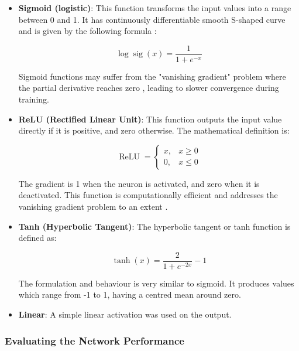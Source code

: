 \begin{itemize}
	\item \textbf{Sigmoid (logistic)}: This function transforms the input values into a range between 0 and 1. It has continuously differentiable smooth S-shaped curve and is given by the following formula \cite{Han1995}:
	
	\begin{equation}\label{Logistic sigmoid}
		\log \operatorname{sig}(x)=\frac{1}{1+e^{-x}}
	\end{equation} 
	
	Sigmoid functions may suffer from the "vanishing gradient" problem where the partial derivative reaches zero \cite{Sharma2020}, leading to slower convergence during training.
	
	\item \textbf{ReLU (Rectified Linear Unit)}: This function outputs the input value directly if it is positive, and zero otherwise. The mathematical definition is:
	
	\begin{equation}\label{ReLU}
		\operatorname{ReLU}= \begin{cases}x, & x \geq 0 \\ 0, & x \leq 0\end{cases}
	\end{equation}
	
	The gradient is 1 when the neuron is activated, and zero when it is deactivated. This function is computationally efficient and addresses the vanishing gradient problem to an extent \cite{Sharma2020}.
	
	\item \textbf{Tanh (Hyperbolic Tangent)}: The hyperbolic tangent or tanh function is defined as:
	
	\begin{equation}\label{Hyperbolic tangent}
		\tanh (x)=\frac{2}{1+e^{-2 x}}-1
	\end{equation}
	
	The formulation and behaviour is very similar to sigmoid. It produces values which range from -1 to 1, having a centred mean around zero.
	
	\item \textbf{Linear}: A simple linear activation was used on the output.
	
\end{itemize}

\subsubsection{Evaluating the Network Performance}

